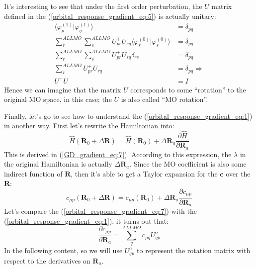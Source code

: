 It's interesting to see that under the first order perturbation, the $U$ matrix
defined in the (\ref{orbital_response_gradient_eq:5}) is actually unitary:
\begin{align}
  \label{orbital_response_gradient_eq:6}
\langle\varphi_{p}^{(1)}|\varphi_{q}^{(1)}\rangle &= \delta_{pq} \nonumber \\
\sum_{r}^{ALL MO}\sum_{s}^{ALL
MO}U_{pr}^{+}U_{sq}\langle\varphi_{r}^{(0)}|\varphi_{s}^{(0)}\rangle &=
\delta_{pq} \nonumber \\
\sum_{r}^{ALL MO}\sum_{s}^{ALL
MO}U_{pr}^{+}U_{sq}\delta_{rs} &= \delta_{pq} \nonumber \\
\sum_{r}^{ALL MO}U_{pr}^{+}U_{rq} &= \delta_{pq} \Longrightarrow\nonumber \\
U^{+}U &= I
\end{align}
Hence we can imagine that the matrix $U$ corresponds to some ``rotation'' to
the original MO space, in this case; the $U$ is also called ``MO rotation''.

Finally, let's go to see how to understand the 
(\ref{orbital_response_gradient_eq:1}) in another way. First let's rewrite the
Hamiltonian into:
\begin{equation}
 \hat{H}(\bm{R}_{0} + \Delta \bm{R}) = \hat{H}(\bm{R}_{0}) + \Delta
\bm{R}_{a}\frac{\partial \hat{H}}{\partial \bm{R}_{a}}
\end{equation}
This is derived in (\ref{GD_gradient_eq:7}). According to this expression,
the $\lambda$ in the original Hamiltonian is actually $\Delta\bm{R}_{a}$. Since
the MO coefficient is also some indirect function of $\bm{R}$, then it's able
to get a Taylor expansion for the $\bm{c}$ over the $\bm{R}$:
\begin{equation}
  \label{orbital_response_gradient_eq:7}
c_{\mu p}(\bm{R}_{0} + \Delta \bm{R}) =  c_{\mu p}(\bm{R}_{0}) + \Delta
\bm{R}_{a}\frac{\partial c_{\mu p}}{\partial \bm{R}_{a}}
\end{equation}
 Let's compare the (\ref{orbital_response_gradient_eq:7}) with the
(\ref{orbital_response_gradient_eq:1}), it turns out that:
\begin{equation}
   \label{orbital_response_gradient_eq:8}
\frac{\partial c_{\mu p}}{\partial \bm{R}_{a}} = \sum_{q}^{ALL
MO}c_{\mu q}U^{a}_{qp}
\end{equation}
In the following content, so we will use $U^{a}_{qp}$ to represent the rotation
matrix with respect to the derivatives on $\bm{R}_{a}$.


